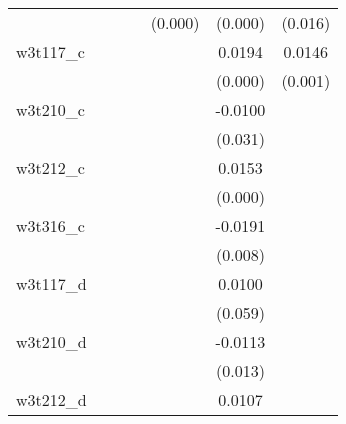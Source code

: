 {\begin{tabular}{l*{6}{c}}
            &                     &                     &                     &     (0.000)         &     (0.000)         &     (0.016)         \\
[1em]
w3t117\_c    &                     &                     &                     &                     &      0.0194\sym{***}&      0.0146\sym{***}\\
            &                     &                     &                     &                     &     (0.000)         &     (0.001)         \\
[1em]
w3t210\_c    &                     &                     &                     &                     &     -0.0100\sym{**} &                     \\
            &                     &                     &                     &                     &     (0.031)         &                     \\
[1em]
w3t212\_c    &                     &                     &                     &                     &      0.0153\sym{***}&                     \\
            &                     &                     &                     &                     &     (0.000)         &                     \\
[1em]
w3t316\_c    &                     &                     &                     &                     &     -0.0191\sym{***}&                     \\
            &                     &                     &                     &                     &     (0.008)         &                     \\
[1em]
w3t117\_d    &                     &                     &                     &                     &      0.0100\sym{*}  &                     \\
            &                     &                     &                     &                     &     (0.059)         &                     \\
[1em]
w3t210\_d    &                     &                     &                     &                     &     -0.0113\sym{**} &                     \\
            &                     &                     &                     &                     &     (0.013)         &                     \\
[1em]
w3t212\_d    &                     &                     &                     &                     &      0.0107\sym{***}&                     \\

\end{tabular}}
